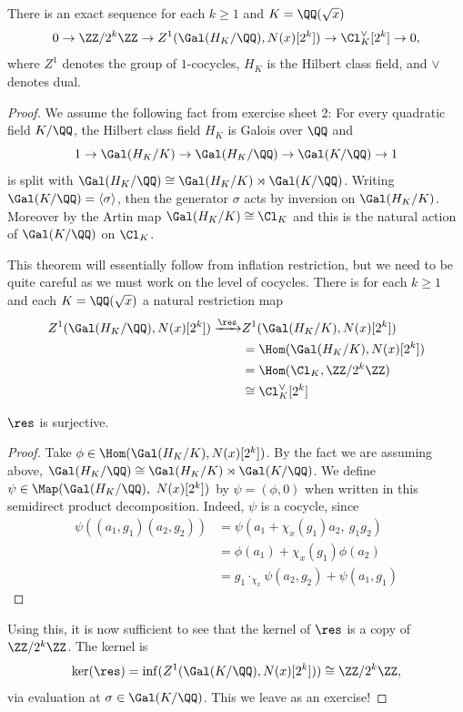 \documentclass{lecturenotes}
\numberwithin{equation}{section}
\begin{document}
\begin{theorem}\label{thm:L1thm1}
    There is an exact sequence for each $k\geq 1$ and $K=\QQ(\sqrt{x})$
    \[0\to \ZZ/2^k\ZZ\to Z^1(\gal(H_K/\QQ), N(x)[2^k])\to \Cl_K^\vee [2^k]\to 0,\]
    where $Z^1$ denotes the group of $1$-cocycles, $H_K$ is the Hilbert class field, and $\vee$ denotes dual.
\end{theorem}
\begin{proof}
    We assume the following fact from exercise sheet 2:  For every quadratic field $K/\QQ$, the Hilbert class field $H_K$ is Galois over $\QQ$ and
    \[1\to \gal(H_K/K)\to \gal(H_K/\QQ)\to \gal(K/\QQ)\to 1\]
    is split with $\gal(H_K/\QQ)\cong \gal(H_K/K)\rtimes \gal(K/\QQ)$.  Writing $\gal(K/\QQ)=\gp{\sigma}$, then the generator $\sigma$ acts by inversion on $\gal(H_K/K)$.  Moreover by the Artin map $\gal(H_K/K)\cong \Cl_K$ and this is the natural action of $\gal(K/\QQ)$ on $\Cl_K$.

    This theorem will essentially follow from inflation restriction, but we need to be quite careful as we must work on the level of cocycles.  There is for each $k\geq 1$ and each $K=\QQ(\sqrt{x})$ a natural restriction map
    \begin{align*}
    Z^1(\gal(H_K/\QQ), N(x)[2^k])\xrightarrow{\res}&Z^1(\gal(H_K/K), N(x)[2^k])
    \\&=\Hom(\gal(H_K/K), N(x)[2^k])
    \\&=\Hom(\Cl_K, \ZZ/2^k\ZZ)
    \\&\cong \Cl_K^\vee[2^k]
    \end{align*}

    \begin{lemma}
        $\res$ is surjective.
    \end{lemma}
    \begin{proof}
        Take $\phi\in \Hom(\gal(H_K/K), N(x)[2^k])$.  By the fact we are assuming above, $\Gal(H_K/\QQ)\cong \gal(H_K/K)\rtimes \gal(K/\QQ)$.  We define $\psi\in \Map(\gal(H_K/\QQ),\ N(x)[2^k])$ by $\psi=(\phi,0)$ when written in this semidirect product decomposition.  Indeed, $\psi$ is a cocycle, since 
        \begin{align*}
        \psi((a_1,g_1)(a_2,g_2))
        &=\psi(a_1+\chi_x(g_1)a_2,\ g_1g_2)
        \\&=\phi(a_1)+\chi_x(g_1)\phi(a_2)
        \\&=g_1\cdot_{\chi_x} \psi(a_2,g_2) + \psi(a_1,g_1)
        \end{align*}
    \end{proof}
    Using this, it is now sufficient to see that the kernel of $\res$ is a copy of $\ZZ/2^k\ZZ$.  The kernel is 
    \[\ker(\res)= \inf(Z^1(\gal(K/\QQ), N(x)[2^k]))\cong \ZZ/2^k\ZZ,\]
    via evaluation at $\sigma\in \gal(K/\QQ)$. This we leave as an exercise!


\end{proof}
\end{document}
